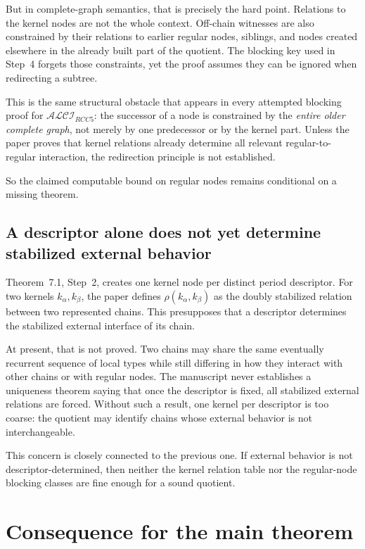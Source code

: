 \documentclass[11pt]{article}
\begin{document}
But in complete-graph semantics, that is precisely the hard point. Relations to the kernel nodes are not the whole context. Off-chain witnesses are also constrained by their relations to earlier regular nodes, siblings, and nodes created elsewhere in the already built part of the quotient. The blocking key used in Step~4 forgets those constraints, yet the proof assumes they can be ignored when redirecting a subtree.

This is the same structural obstacle that appears in every attempted blocking proof for $\mathcal{ALCI}_{RCC5}$: the successor of a node is constrained by the \emph{entire older complete graph}, not merely by one predecessor or by the kernel part. Unless the paper proves that kernel relations already determine all relevant regular-to-regular interaction, the redirection principle is not established.

So the claimed computable bound on regular nodes remains conditional on a missing theorem.

\subsection{A descriptor alone does not yet determine stabilized external behavior}

Theorem~7.1, Step~2, creates one kernel node per distinct period descriptor. For two kernels $k_\alpha,k_\beta$, the paper defines $\rho(k_\alpha,k_\beta)$ as the doubly stabilized relation between two represented chains. This presupposes that a descriptor determines the stabilized external interface of its chain.

At present, that is not proved. Two chains may share the same eventually recurrent sequence of local types while still differing in how they interact with other chains or with regular nodes. The manuscript never establishes a uniqueness theorem saying that once the descriptor is fixed, all stabilized external relations are forced. Without such a result, one kernel per descriptor is too coarse: the quotient may identify chains whose external behavior is not interchangeable.

This concern is closely connected to the previous one. If external behavior is not descriptor-determined, then neither the kernel relation table nor the regular-node blocking classes are fine enough for a sound quotient.

\section{Consequence for the main theorem}
\end{document}

